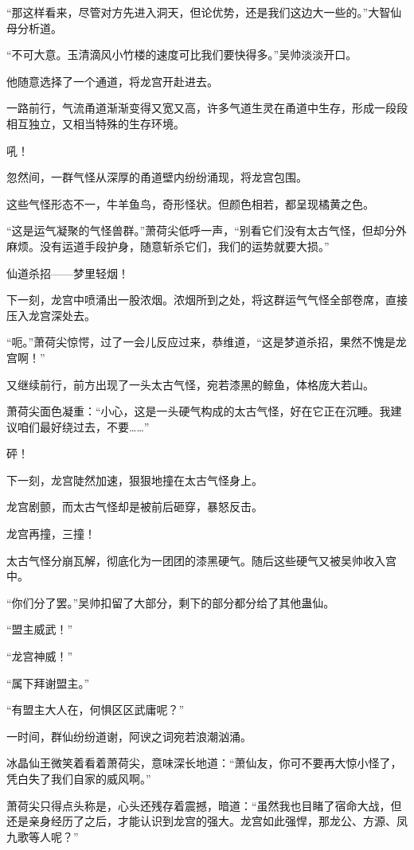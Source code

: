 \begin{this_body}
“那这样看来，尽管对方先进入洞天，但论优势，还是我们这边大一些的。”大智仙母分析道。

“不可大意。玉清滴风小竹楼的速度可比我们要快得多。”吴帅淡淡开口。

他随意选择了一个通道，将龙宫开赴进去。

一路前行，气流甬道渐渐变得又宽又高，许多气道生灵在甬道中生存，形成一段段相互独立，又相当特殊的生存环境。

吼！

忽然间，一群气怪从深厚的甬道壁内纷纷涌现，将龙宫包围。

这些气怪形态不一，牛羊鱼鸟，奇形怪状。但颜色相若，都呈现橘黄之色。

“这是运气凝聚的气怪兽群。”萧荷尖低呼一声，“别看它们没有太古气怪，但却分外麻烦。没有运道手段护身，随意斩杀它们，我们的运势就要大损。”

仙道杀招——梦里轻烟！

下一刻，龙宫中喷涌出一股浓烟。浓烟所到之处，将这群运气气怪全部卷席，直接压入龙宫深处去。

“呃。”萧荷尖惊愕，过了一会儿反应过来，恭维道，“这是梦道杀招，果然不愧是龙宫啊！”

又继续前行，前方出现了一头太古气怪，宛若漆黑的鲸鱼，体格庞大若山。

萧荷尖面色凝重：“小心，这是一头硬气构成的太古气怪，好在它正在沉睡。我建议咱们最好绕过去，不要……”

砰！

下一刻，龙宫陡然加速，狠狠地撞在太古气怪身上。

龙宫剧颤，而太古气怪却是被前后砸穿，暴怒反击。

龙宫再撞，三撞！

太古气怪分崩瓦解，彻底化为一团团的漆黑硬气。随后这些硬气又被吴帅收入宫中。

“你们分了罢。”吴帅扣留了大部分，剩下的部分都分给了其他蛊仙。

“盟主威武！”

“龙宫神威！”

“属下拜谢盟主。”

“有盟主大人在，何惧区区武庸呢？”

一时间，群仙纷纷道谢，阿谀之词宛若浪潮汹涌。

冰晶仙王微笑着看着萧荷尖，意味深长地道：“萧仙友，你可不要再大惊小怪了，凭白失了我们自家的威风啊。”

萧荷尖只得点头称是，心头还残存着震撼，暗道：“虽然我也目睹了宿命大战，但还是亲身经历了之后，才能认识到龙宫的强大。龙宫如此强悍，那龙公、方源、凤九歌等人呢？”


\end{this_body}
